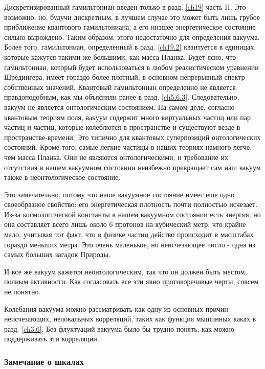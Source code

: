 \documentclass[main.tex]{subfiles}
\begin{document}
Дискретизированный гамильтониан введен только в разд. \ref{ch19} часть II. Это возможно, но, будучи дискретным, в лучшем случае это может быть лишь грубое приближение квантового гамильтониана, а его низшее энергетическое состояние сильно вырождено. Таким образом, этого недостаточно для определения вакуума. Более того, гамильтониан, определенный в разд. \ref{ch19.2} квантуется в единицах, которые кажутся такими же большими, как масса Планка. Будет ясно, что гамильтониан, который будет использоваться в любом реалистическом уравнении Шредингера, имеет гораздо более плотный, в основном непрерывный спектр собственных значений. Квантовый гамильтониан определенно не является правдоподобным, как мы объясняли ранее в разд. \ref{ch5.6.3}. Следовательно, вакуум не является онтологическим состоянием.
На самом деле, согласно квантовым теориям поля, вакуум содержит много виртуальных частиц или пар частиц и частиц, которые колеблются в пространстве и существуют везде в пространстве-времени. Это типично для квантовых суперпозиций онтологических состояний. Кроме того, самые легкие частицы в наших теориях намного легче, чем масса Планка. Они не являются онтологическими, и требование их отсутствия в нашем вакуумном состоянии неизбежно превращает сам наш вакуум также в неонтологическое состояние.

Это замечательно, потому что наше вакуумное состояние имеет еще одно своеобразное свойство: его энергетическая плотность почти полностью исчезает. Из-за космологической константы в нашем вакуумном состоянии есть энергия, но она составляет всего лишь около 6 протонов на кубический метр, что крайне мало, учитывая тот факт, что в  физике частиц действо происходит в масштабах гораздо меньших метра. Это очень маленькое, но неисчезающее число - одна из самых больших загадок Природы.

И все же вакуум кажется неонтологическим, так что он должен быть местом, полным активности. Как согласовать все эти явно противоречивые черты, совсем не понятно.

Колебания вакуума можно рассматривать как одну из основных причин неисчезающих, нелокальных корреляций, таких как функция мышинных каках в разд. \ref{ch3.6}. Без флуктуаций вакуума было бы трудно понять, как можно поддерживать эти корреляции.

\subsubsection{Замечание о шкалах }\label{ch5.7.6}
\end{document}
